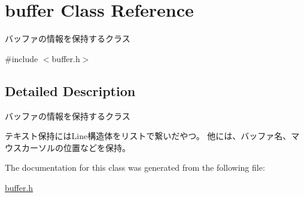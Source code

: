 \hypertarget{classbuffer}{}\section{buffer Class Reference}
\label{classbuffer}


バッファの情報を保持するクラス  




{\ttfamily \#include $<$buffer.\+h$>$}



\subsection{Detailed Description}
バッファの情報を保持するクラス 

テキスト保持には\+Line構造体をリストで繋いだやつ。 他には、バッファ名、マウスカーソルの位置などを保持。 

The documentation for this class was generated from the following file\+:\begin{DoxyCompactItemize}
\item 
\hyperlink{buffer_8h}{buffer.\+h}\end{DoxyCompactItemize}
